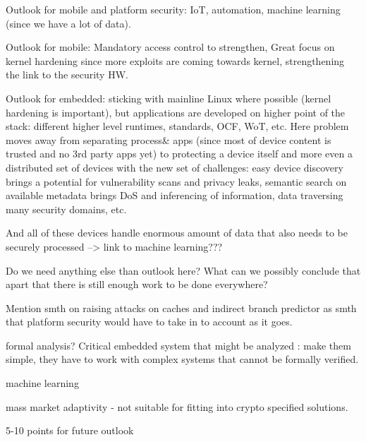 
Outlook for mobile and platform security: IoT, automation, machine learning (since we have a lot of data).

Outlook for mobile: Mandatory access control to strengthen, Great focus on kernel hardening since more exploits are coming towards kernel, strengthening the link to the security HW. 

Outlook for embedded: sticking with mainline Linux where possible (kernel hardening is important), but applications are developed on higher point of the stack: different higher level runtimes, standards, OCF, WoT, etc. Here problem moves away from separating process& apps (since most of device content is trusted and no 3rd party apps yet) to protecting a device itself and more even a distributed set of devices with the new set of challenges: easy device discovery brings a potential for vulnerability scans and privacy leaks, semantic search on available metadata brings DoS and inferencing of information, data traversing many security domains, etc.

And all of these devices handle enormous amount of data that also needs to be securely processed --> link to machine learning???


Do we need anything else than outlook here? What can we possibly conclude that apart that there is still enough work to be done everywhere? 

Mention smth on raising attacks on caches and indirect branch predictor as smth that platform security would have to take in to account as it goes. 

formal analysis? Critical embedded system that might be analyzed : make them simple, they have to work with complex systems that cannot be formally verified.

machine learning

mass market adaptivity - not suitable for fitting into crypto specified solutions. 


5-10 points for future outlook 


  